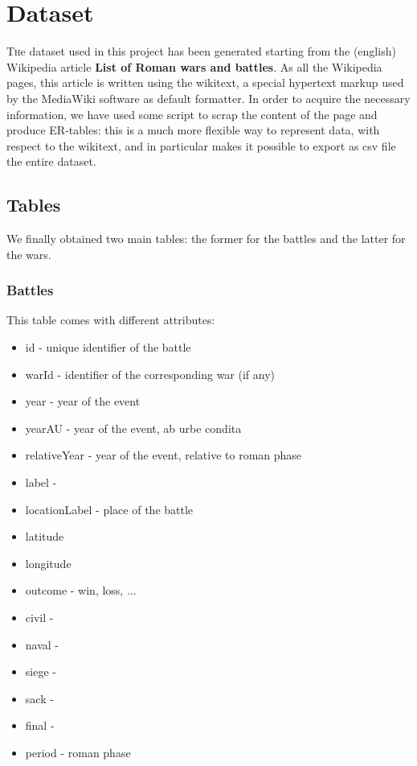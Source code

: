 \section{Dataset}

\lettrine[nindent=0em,lines=3]{T} he dataset used in this project has been generated starting from the (english) Wikipedia article \textbf{List of Roman wars and battles}. As all the Wikipedia pages, this article is written using the wikitext, a special hypertext markup used by the MediaWiki software as default formatter. In order to acquire the necessary information, we have used some script to scrap the content of the page and produce ER-tables: this is a much more flexible way to represent data, with respect to the wikitext, and in particular makes it possible to export as csv file the entire dataset.

\subsection{Tables}
We finally obtained two main tables: the former for the battles and the latter for the wars.

\subsubsection{Battles}
This table comes with different attributes:
\begin{itemize}
    \item id - unique identifier of the battle
    \item warId - identifier of the corresponding war (if any)
    \item year - year of the event
    \item yearAU - year of the event, ab urbe condita
    \item relativeYear - year of the event, relative to roman phase
    \item label - 
    \item locationLabel - place of the battle
    \item latitude 
    \item longitude
    \item outcome - win, loss, ...
    \item civil -
    \item naval -
    \item siege -
    \item sack -
    \item final -
    \item period - roman phase
\end{itemize}

